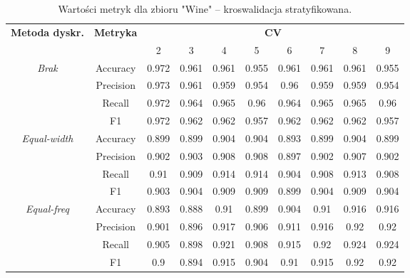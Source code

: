\begin{table}[H]
\center
    \caption{Wartości metryk dla zbioru "Wine" -- kroswalidacja stratyfikowana.}
    \begin{tabular}{|c|c|c|c|c|c|c|c|c|c|}
        \hline
        \multirow{2}{*}{\textbf{Metoda dyskr.}} & \multirow{2}{*}{\textbf{Metryka}} & \multicolumn{8}{|c|}{\textbf{CV}} \\ \cline{3-10}
                        &  & 2 & 3 & 4 & 5 & 6 & 7 & 8 & 9 \\ \hline
        \multirow{4}{*}{\textit{Brak}}  & Accuracy & 0.972 & 0.961 & 0.961 & 0.955 & 0.961 & 0.961 & 0.961 & 0.955 \\ \cline{2-10}
                                     & Precision & 0.973 & 0.961 & 0.959 & 0.954 & 0.96 & 0.959 & 0.959 & 0.954 \\ \cline{2-10}
                                     & Recall & 0.972 & 0.964 & 0.965 & 0.96 & 0.964 & 0.965 & 0.965 & 0.96 \\ \cline{2-10}
                                     & F1 & 0.972 & 0.962 & 0.962 & 0.957 & 0.962 & 0.962 & 0.962 & 0.957 \\ \hline \hline


        \multirow{4}{*}{\textit{Equal-width}}  & Accuracy & 0.899 & 0.899 & 0.904 & 0.904 & 0.893 & 0.899 & 0.904 & 0.899 \\ \cline{2-10}
                                             & Precision & 0.902 & 0.903 & 0.908 & 0.908 & 0.897 & 0.902 & 0.907 & 0.902 \\ \cline{2-10}
                                             & Recall & 0.91 & 0.909 & 0.914 & 0.914 & 0.904 & 0.908 & 0.913 & 0.908 \\ \cline{2-10}
                                             & F1 & 0.903 & 0.904 & 0.909 & 0.909 & 0.899 & 0.904 & 0.909 & 0.904 \\ \hline \hline


        \multirow{4}{*}{\textit{Equal-freq}}  & Accuracy & 0.893 & 0.888 & 0.91 & 0.899 & 0.904 & 0.91 & 0.916 & 0.916 \\ \cline{2-10}
                                             & Precision & 0.901 & 0.896 & 0.917 & 0.906 & 0.911 & 0.916 & 0.92 & 0.92 \\ \cline{2-10}
                                             & Recall & 0.905 & 0.898 & 0.921 & 0.908 & 0.915 & 0.92 & 0.924 & 0.924 \\ \cline{2-10}
                                             & F1 & 0.9 & 0.894 & 0.915 & 0.904 & 0.91 & 0.915 & 0.92 & 0.92 \\ \hline \hline



\end{tabular}
\end{table}
